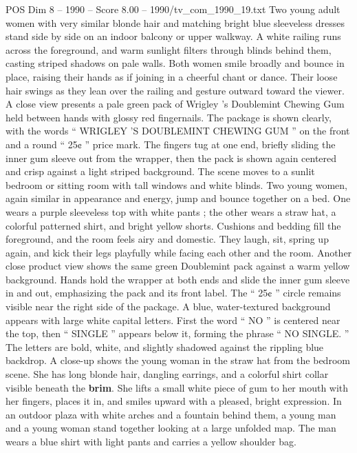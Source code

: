\begin{textsample}{POS Dim 8 – 1990 – Score 8.00 – 1990/tv\_com\_1990\_19.txt}  \label{ex:f8_pos_061}
Two young adult women with very similar blonde hair and matching bright blue sleeveless dresses stand side by side on an indoor balcony or upper walkway.
A white railing runs across the foreground, and warm sunlight filters through blinds behind them, casting striped shadows on pale walls.
Both women smile broadly and bounce in place, raising their hands as if joining in a cheerful chant or dance.
Their loose hair swings as they lean over the railing and gesture outward toward the viewer.
A close view presents a pale green pack of Wrigley ’s Doublemint Chewing Gum held between hands with glossy red fingernails.
The package is shown clearly, with the words “ WRIGLEY ’S DOUBLEMINT CHEWING GUM ” on the front and a round “ 25¢ ” price mark.
The fingers tug at one end, briefly sliding the inner gum sleeve out from the wrapper, then the pack is shown again centered and crisp against a light striped background.
The scene moves to a sunlit bedroom or sitting room with tall windows and white blinds.
Two young women, again similar in appearance and energy, jump and bounce together on a bed.
One wears a purple sleeveless top with white pants ; the other wears a straw hat, a colorful patterned shirt, and bright yellow shorts.
Cushions and bedding fill the foreground, and the room feels airy and domestic.
They laugh, sit, spring up again, and kick their legs playfully while facing each other and the room.
Another close product view shows the same green Doublemint pack against a warm yellow background.
Hands hold the wrapper at both ends and slide the inner gum sleeve in and out, emphasizing the pack and its front label.
The “ 25¢ ” circle remains visible near the right side of the package.
A blue, water-textured background appears with large white capital letters.
First the word “ NO ” is centered near the top, then “ SINGLE ” appears below it, forming the phrase “ NO SINGLE. ” The letters are bold, white, and slightly shadowed against the rippling blue backdrop.
A close-up shows the young woman in the straw hat from the bedroom scene.
She has long blonde hair, dangling earrings, and a colorful shirt collar visible beneath the \textbf{brim}.
She lifts a small white piece of gum to her mouth with her fingers, places it in, and smiles upward with a pleased, bright expression.
In an outdoor plaza with white arches and a fountain behind them, a young man and a young woman stand together looking at a large unfolded map.
The man wears a blue shirt with light pants and carries a yellow shoulder bag.

\end{textsample}
